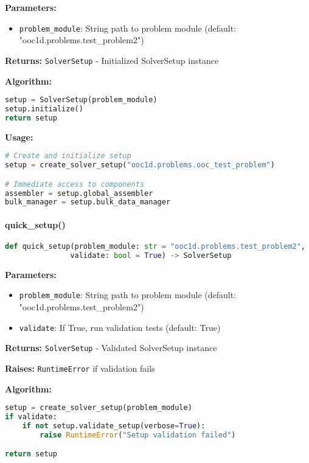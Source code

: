 \textbf{Parameters:}
\begin{itemize}
    \item \texttt{problem\_module}: String path to problem module (default: "ooc1d.problems.test\_problem2")
\end{itemize}

\textbf{Returns:} \texttt{SolverSetup} - Initialized SolverSetup instance

\textbf{Algorithm:}
\begin{lstlisting}[language=Python, caption=Factory Function Implementation]
setup = SolverSetup(problem_module)
setup.initialize()
return setup
\end{lstlisting}

\textbf{Usage:}
\begin{lstlisting}[language=Python, caption=Factory Function Usage]
# Create and initialize setup
setup = create_solver_setup("ooc1d.problems.ooc_test_problem")

# Immediate access to components
assembler = setup.global_assembler
bulk_manager = setup.bulk_data_manager
\end{lstlisting}

\paragraph{quick\_setup()}
\begin{lstlisting}[language=Python, caption=Quick Setup Function]
def quick_setup(problem_module: str = "ooc1d.problems.test_problem2", 
               validate: bool = True) -> SolverSetup
\end{lstlisting}

\textbf{Parameters:}
\begin{itemize}
    \item \texttt{problem\_module}: String path to problem module (default: "ooc1d.problems.test\_problem2")
    \item \texttt{validate}: If True, run validation tests (default: True)
\end{itemize}

\textbf{Returns:} \texttt{SolverSetup} - Validated SolverSetup instance

\textbf{Raises:} \texttt{RuntimeError} if validation fails

\textbf{Algorithm:}
\begin{lstlisting}[language=Python, caption=Quick Setup Implementation]
setup = create_solver_setup(problem_module)
if validate:
    if not setup.validate_setup(verbose=True):
        raise RuntimeError("Setup validation failed")

return setup
\end{lstlisting}

